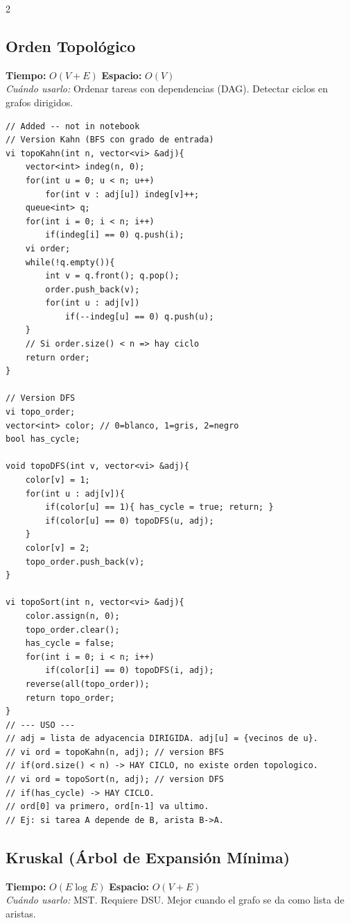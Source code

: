 \documentclass[10pt,a4paper]{article}
\begin{document}
\begin{multicols}{2}
\subsection{Orden Topol\'ogico}
\textbf{Tiempo:} $O(V + E)$ \quad \textbf{Espacio:} $O(V)$\\
\textit{Cu\'ando usarlo:} Ordenar tareas con dependencias (DAG). Detectar ciclos en grafos dirigidos.

\begin{lstlisting}
// Added -- not in notebook
// Version Kahn (BFS con grado de entrada)
vi topoKahn(int n, vector<vi> &adj){
    vector<int> indeg(n, 0);
    for(int u = 0; u < n; u++)
        for(int v : adj[u]) indeg[v]++;
    queue<int> q;
    for(int i = 0; i < n; i++)
        if(indeg[i] == 0) q.push(i);
    vi order;
    while(!q.empty()){
        int v = q.front(); q.pop();
        order.push_back(v);
        for(int u : adj[v])
            if(--indeg[u] == 0) q.push(u);
    }
    // Si order.size() < n => hay ciclo
    return order;
}

// Version DFS
vi topo_order;
vector<int> color; // 0=blanco, 1=gris, 2=negro
bool has_cycle;

void topoDFS(int v, vector<vi> &adj){
    color[v] = 1;
    for(int u : adj[v]){
        if(color[u] == 1){ has_cycle = true; return; }
        if(color[u] == 0) topoDFS(u, adj);
    }
    color[v] = 2;
    topo_order.push_back(v);
}

vi topoSort(int n, vector<vi> &adj){
    color.assign(n, 0);
    topo_order.clear();
    has_cycle = false;
    for(int i = 0; i < n; i++)
        if(color[i] == 0) topoDFS(i, adj);
    reverse(all(topo_order));
    return topo_order;
}
// --- USO ---
// adj = lista de adyacencia DIRIGIDA. adj[u] = {vecinos de u}.
// vi ord = topoKahn(n, adj); // version BFS
// if(ord.size() < n) -> HAY CICLO, no existe orden topologico.
// vi ord = topoSort(n, adj); // version DFS
// if(has_cycle) -> HAY CICLO.
// ord[0] va primero, ord[n-1] va ultimo.
// Ej: si tarea A depende de B, arista B->A.
\end{lstlisting}

\subsection{Kruskal (\'Arbol de Expansi\'on M\'inima)}
\textbf{Tiempo:} $O(E \log E)$ \quad \textbf{Espacio:} $O(V + E)$\\
\textit{Cu\'ando usarlo:} MST. Requiere DSU. Mejor cuando el grafo se da como lista de aristas.


\end{multicols}
\end{document}
